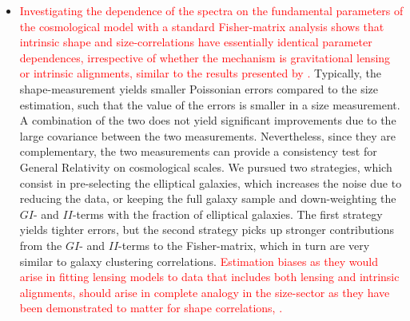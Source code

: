 \documentclass[a4paper,fleqn,usenatbib]{mnras}
\newcommand\spirou[1]{\textcolor{red}{#1}}
\begin{document}
\begin{itemize}
\item{\spirou{Investigating the dependence of the spectra on the fundamental parameters of the cosmological model with a standard Fisher-matrix analysis shows that intrinsic shape and size-correlations have essentially identical parameter dependences, irrespective of whether the mechanism is gravitational lensing or intrinsic alignments, similar to the results presented by \citet{alsing_weak_2014}.} Typically, the shape-measurement yields smaller Poissonian errors compared to the size estimation, such that the value of the errors is smaller in a size measurement. A combination of the two does not yield significant improvements due to the large covariance between the two measurements. Nevertheless, since they are complementary, the two measurements can provide a consistency test for General Relativity on cosmological scales. We pursued two strategies, which consist in pre-selecting the elliptical galaxies, which increases the noise due to reducing the data, or keeping the full galaxy sample and down-weighting the $GI$- and $II$-terms with the fraction of elliptical galaxies. The first strategy yields tighter errors, but  the second strategy picks up stronger contributions from the $GI$- and $II$-terms to the Fisher-matrix, which in turn are very similar to galaxy clustering correlations. \spirou{Estimation biases as they would arise in fitting lensing models to data that includes both lensing and intrinsic alignments, should arise in complete analogy in the size-sector as they have been demonstrated to matter for shape correlations, \citep{joachimi_simultaneous_2010, kirk_galaxy_2015, joachimi_galaxy_2015, krause_impact_2016}.}}

\end{itemize}
\end{document}

